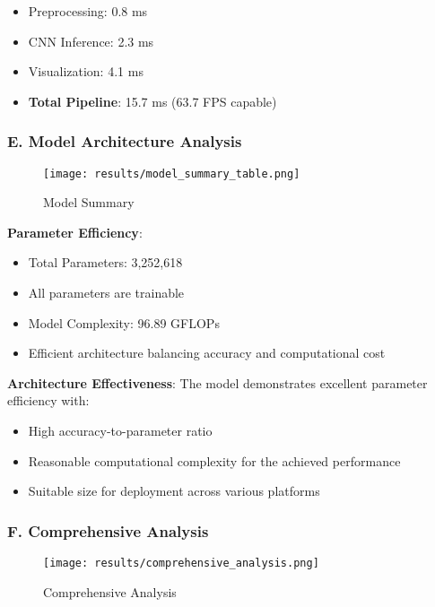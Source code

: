 \documentclass[11pt,a4paper,twoside]{article}
\providecommand{\tightlist}{%
  \setlength{\itemsep}{0pt}\setlength{\parskip}{0pt}}
\begin{document}
\begin{itemize}
\tightlist
\item
  Preprocessing: 0.8 ms
\item
  CNN Inference: 2.3 ms
\item
  Visualization: 4.1 ms
\item
  \textbf{Total Pipeline}: 15.7 ms (63.7 FPS capable)
\end{itemize}

\subsubsection{E. Model Architecture
Analysis}\label{e.-model-architecture-analysis}

\begin{figure}
\centering
\texttt{[image: results/model\_summary\_table.png]}
\caption{Model Summary}
\end{figure}

\textbf{Parameter Efficiency}:

\begin{itemize}
\tightlist
\item
  Total Parameters: 3,252,618
\item
  All parameters are trainable
\item
  Model Complexity: 96.89 GFLOPs
\item
  Efficient architecture balancing accuracy and computational cost
\end{itemize}

\textbf{Architecture Effectiveness}: The model demonstrates excellent
parameter efficiency with:

\begin{itemize}
\tightlist
\item
  High accuracy-to-parameter ratio
\item
  Reasonable computational complexity for the achieved performance
\item
  Suitable size for deployment across various platforms
\end{itemize}

\subsubsection{F. Comprehensive
Analysis}\label{f.-comprehensive-analysis}

\begin{figure}
\centering
\texttt{[image: results/comprehensive\_analysis.png]}
\caption{Comprehensive Analysis}
\end{figure}
\end{document}
